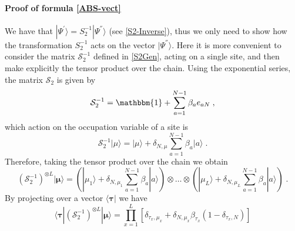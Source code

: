 \documentclass[10pt]{article}
\numberwithin{equation}{section}
\numberwithin{equation}{subsection}
\newcommand{\co}{\;,}
\newcommand{\dt}{\;.}
\begin{document}
\paragraph{Proof of formula \eqref{ABS-vect}} We have that $|\Psi^{'}\rangle=S_{2}^{-1}|\Psi^{''}\rangle$ (see \eqref{S2-Inverse}), thus we only need to show how the transformation $S_{2}^{-1}$ acts on the vector $|\Psi^{''}\rangle$. Here it is more convenient to consider the matrix $\mathcal{S}_{2}^{-1}$ defined in \eqref{S2Gen}, acting on a single site, and then make explicitly the tensor product over the chain. Using the exponential series, the matrix $\mathcal{S}_{2}$ is given by 
\begin{equation}
   \mathcal{S}_{2}^{-1}=\mathbbm{1}+\sum_{a=1}^{N-1}\beta_{a}e_{aN}\co
\end{equation}
which action on the occupation variable of a site is 
\begin{equation}
  \mathcal{S}_{2}^{-1} |\mu\rangle= |\mu\rangle+\delta_{N,\mu}\sum_{a=1}^{N-1}\beta_a|a\rangle\dt
\end{equation} 
Therefore, taking the tensor product over the chain we obtain 
\begin{equation}
  \left(\mathcal{S}_{2}^{-1}\right)^{\otimes L} |\bm{\mu}\rangle=\left( |\mu_1\rangle+\delta_{N,\mu_1}\sum_{a=1}^{N-1}\beta_a|a\rangle\right)\otimes\ldots\otimes \left( |\mu_L\rangle+\delta_{N,\mu_L}\sum_{a=1}^{N-1}\beta_a|a\rangle\right)\dt
\end{equation} 
By projecting over a vector $\langle \bm{\tau}|$ we have 
\begin{equation}\label{goodTP-S2}
  \langle \bm{\tau}|\left(\mathcal{S}_{2}^{-1}\right)^{\otimes L} |\bm{\mu}\rangle=\prod_{x=1}^L\left[ \delta_{\tau_x,\mu_x}+\delta_{N,\mu_x}\beta_{\tau_x} (1-\delta_{\tau_x,N})\right]
\end{equation} 
\begin{comment}
{\color{blue}
We introduce $\forall x\in\{1,\ldots,L\}$, for $i\in \{1,\ldots,L\}$ and $q_{1},\ldots,q_{i}\in\{1,\ldots,L\}$ 
\begin{equation}
	\varphi_{x}^{i}(q_{1},\ldots,q_{i})=\begin{cases}
		\tau_{x}\qquad &\text{if}\quad x\notin\{q_{1},\ldots,q_{i}\}\\
		N\qquad &\text{if}\quad x\in\{q_{1},\ldots,q_{i}\}\\
	\end{cases}\dt
\end{equation}
This is a new configuration at site $x$ where, if $x\in\{q_{1},\ldots,q_{i}\}$, the occupation $\tau_{x}$ is replaced by $N$, while it is left uncaged if $x\notin \{q_{1},\ldots,q_{i}\}$. The dependence of $\varphi_{x}^{i}(q_{1},\ldots,q_{i})$ with respect to $q_{1},\ldots,q_{i}$ is usually understood for the sake of notation. } 
\end{comment}
\end{document}
